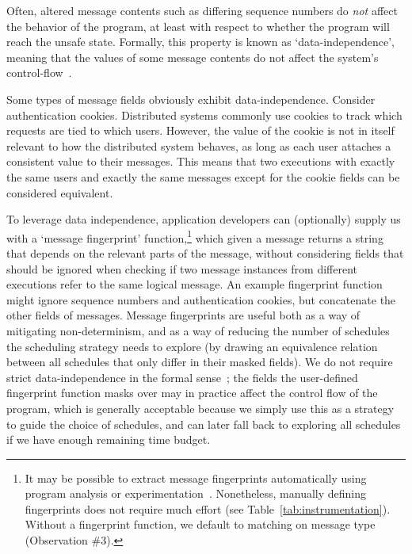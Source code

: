  Often, altered message
contents such as differing sequence numbers do {\em not} affect the behavior of the
program, at least with respect to whether the program will reach the
unsafe state. Formally, this property is known as
`data-independence', meaning that the values of some message contents
do not affect the system's control-flow~\cite{shacham2014verifying,wolper}.

Some types of message fields obviously exhibit
data-independence. Consider authentication cookies. Distributed systems commonly
use cookies to track which requests are tied to which users. However, the
value of the cookie is not in itself relevant to how the distributed system
behaves, as long as each user attaches a consistent value to their messages. This means that two executions
with exactly the same users and exactly the same messages except for the
cookie fields can be considered equivalent.

To leverage data independence, application developers can (optionally) supply us
with a `message fingerprint' function,\footnote{It may be possible to extract
message fingerprints automatically using program analysis or experimentation~\cite{diffy}.
Nonetheless, manually defining fingerprints does not require much effort (see
Table~\ref{tab:instrumentation}). Without a fingerprint function, we default
to matching on message type (Observation \#3).}
which given a message returns a string that depends on the relevant parts of the message,
without considering fields that should be ignored when checking if two message instances from
different executions refer to the same logical message.
An example fingerprint function might ignore sequence numbers and authentication cookies, but
concatenate the other fields of messages.
Message fingerprints are useful both as a way of mitigating non-determinism, and as a way of
reducing the number of schedules the scheduling strategy needs to explore (by drawing an equivalence relation
between all schedules that only differ in their masked fields).
We do not require strict data-independence in the formal
sense~\cite{shacham2014verifying}; the fields the user-defined fingerprint
function masks over may in practice affect the control flow of the program,
which is generally acceptable because we simply use this as a strategy to guide the
choice of schedules, and can later fall back to exploring all schedules if we
have enough remaining time budget.


